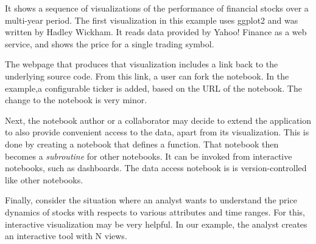 It shows a sequence of visualizations of the performance
of financial stocks over a multi-year period. The first visualization
in this example uses ggplot2 and was written by Hadley Wickham.
It reads data provided by Yahoo! Finance as a web service, and shows
the price for a single trading symbol.

The webpage that produces that visualization includes a link back to
the underlying source code. From this link, a user can fork the notebook.
In the example,a configurable ticker is added, based on the URL of
the notebook. The change to the notebook is very minor.

Next, the notebook author or a collaborator may decide to extend
the application to also provide convenient access to the data,
apart from its visualization.
This is done by creating a notebook that defines a function.
That notebook then becomes a \emph{subroutine} for other notebooks.
It can be invoked from interactive notebooks, such as dashboards.
The data access notebook is is version-controlled like other notebooks.

Finally, consider the situation where an analyst wants to understand
the price dynamics of stocks with respects to various attributes and
time ranges. For this, interactive visualization may be very helpful.
In our example, the analyst creates an interactive tool with N views.



%
